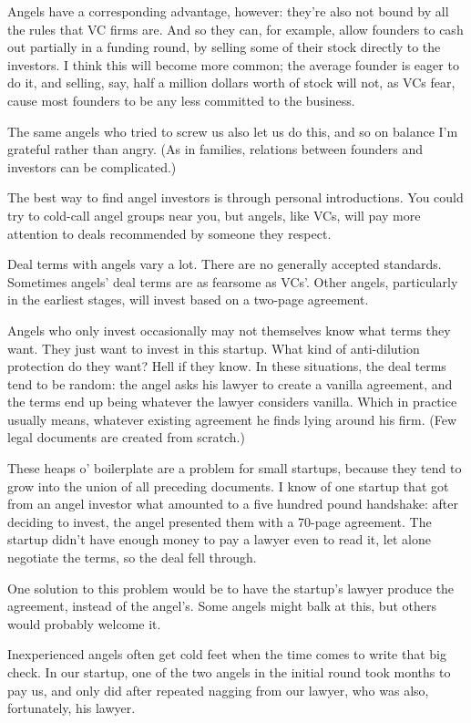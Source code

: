 \documentclass[12pt]{book}
\begin{document}
Angels have a corresponding advantage, however: they're also not bound
by all the rules that VC firms are. And so they can, for example, allow
founders to cash out partially in a funding round, by selling some of
their stock directly to the investors. I think this will become more
common; the average founder is eager to do it, and selling, say, half a
million dollars worth of stock will not, as VCs fear, cause most
founders to be any less committed to the business.

The same angels who tried to screw us also let us do this, and so on
balance I'm grateful rather than angry. (As in families, relations
between founders and investors can be complicated.)

The best way to find angel investors is through personal introductions.
You could try to cold-call angel groups near you, but angels, like VCs,
will pay more attention to deals recommended by someone they respect.

Deal terms with angels vary a lot. There are no generally accepted
standards. Sometimes angels' deal terms are as fearsome as VCs'. Other
angels, particularly in the earliest stages, will invest based on a
two-page agreement.

Angels who only invest occasionally may not themselves know what terms
they want. They just want to invest in this startup. What kind of
anti-dilution protection do they want? Hell if they know. In these
situations, the deal terms tend to be random: the angel asks his lawyer
to create a vanilla agreement, and the terms end up being whatever the
lawyer considers vanilla. Which in practice usually means, whatever
existing agreement he finds lying around his firm. (Few legal documents
are created from scratch.)

These heaps o' boilerplate are a problem for small startups, because
they tend to grow into the union of all preceding documents. I know of
one startup that got from an angel investor what amounted to a five
hundred pound handshake: after deciding to invest, the angel presented
them with a 70-page agreement. The startup didn't have enough money to
pay a lawyer even to read it, let alone negotiate the terms, so the deal
fell through.

One solution to this problem would be to have the startup's lawyer
produce the agreement, instead of the angel's. Some angels might balk at
this, but others would probably welcome it.

Inexperienced angels often get cold feet when the time comes to write
that big check. In our startup, one of the two angels in the initial
round took months to pay us, and only did after repeated nagging from
our lawyer, who was also, fortunately, his lawyer.
\end{document}
